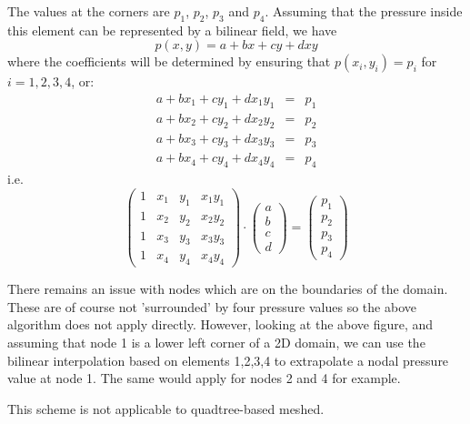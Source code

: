 The values at the corners are $p_1$,
$p_2$, $p_3$ and $p_4$. Assuming that the pressure inside this element 
can be represented by a bilinear field, we have 
\[
p(x,y)= a+ bx +cy +dxy
\]
where the coefficients will be determined by ensuring that 
$p(x_i,y_i)=p_i$ for $i=1,2,3,4$, or:
\begin{eqnarray}
a+bx_1+cy_1+dx_1y_1 &=& p_1 \\
a+bx_2+cy_2+dx_2y_2 &=& p_2 \\
a+bx_3+cy_3+dx_3y_3 &=& p_3 \\
a+bx_4+cy_4+dx_4y_4 &=& p_4 
\end{eqnarray}
i.e.
\[
\left(
\begin{array}{cccc}
1 & x_1 & y_1 & x_1y_1 \\
1 & x_2 & y_2 & x_2y_2 \\
1 & x_3 & y_3 & x_3y_3 \\
1 & x_4 & y_4 & x_4y_4
\end{array}
\right)\cdot
\left(
\begin{array}{c}
a \\b\\c\\d
\end{array}
\right)
=
\left(
\begin{array}{c}
p_1\\p_2\\p_3\\p_4
\end{array}
\right)
\]

There remains an issue with nodes which are on the boundaries of the 
domain. These are of course not 'surrounded' by four pressure values 
so the above algorithm does not apply directly. However, looking 
at the above figure, and assuming that node 1 is a lower left corner 
of a 2D domain, we can use the bilinear interpolation based on elements 
1,2,3,4 to extrapolate a nodal pressure value at node 1. 
The same would apply for nodes 2 and 4 for example. 

\begin{remark}
This scheme is not applicable to quadtree-based meshed.
\end{remark}




